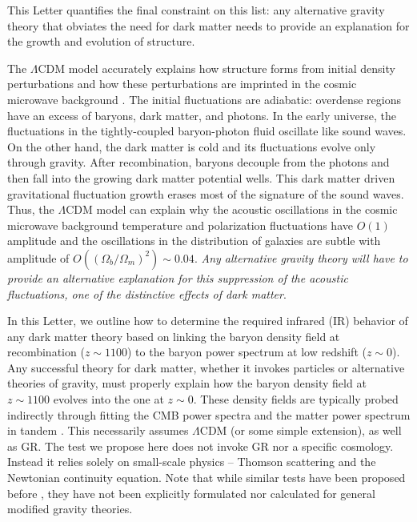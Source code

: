 \documentclass[floats,floatfix,showpacs,amssymb,amsmath,prl,twocolumn,superscriptaddress,nofootinbib, aps]{revtex4-2}
\begin{document}
This Letter quantifies the final constraint on this list: any alternative gravity theory that obviates the need for dark matter needs to provide an explanation for the growth and evolution of structure. 

The $\Lambda$CDM model accurately explains how structure forms from initial density perturbations and how these perturbations are imprinted in the cosmic microwave background \citep{Lifshitz1946, Peebles1970, Sunyaev1970b,Bond1984, Peebles1984}. The initial fluctuations are adiabatic: overdense regions have an excess of baryons, dark matter, and photons. In the early universe, the fluctuations in the tightly-coupled baryon-photon fluid oscillate like sound waves. On the other hand, the dark matter is cold and its fluctuations evolve only through gravity. After recombination, baryons decouple from the photons and then fall into the growing dark matter potential wells. This dark matter driven gravitational fluctuation growth erases most of the signature of the sound waves. Thus, the $\Lambda$CDM model can explain why the acoustic oscillations in the cosmic microwave background temperature and polarization fluctuations have $O(1)$ amplitude and the oscillations in the distribution of galaxies are subtle with amplitude of $O\left((\Omega_b/\Omega_m)^2\right) \sim 0.04$. {\it Any alternative gravity theory will have to provide an alternative explanation for this suppression of the acoustic fluctuations, one of the distinctive effects of dark matter}.

In this Letter, we outline how to determine the required infrared (IR) behavior of any dark matter theory based on linking the baryon density field at recombination ($z\sim1100$) to the baryon power spectrum at low redshift ($z\sim 0$). Any successful theory for dark matter, whether it invokes particles or alternative theories of gravity, must properly explain how the baryon density field at $z\sim 1100$ evolves into the one at $z\sim 0$. These density fields are typically probed indirectly through fitting the CMB power spectra and the matter power spectrum in tandem \citep[e.g.,][]{Spergel2003, Planck2018}. This necessarily assumes $\Lambda$CDM (or some simple extension), as well as GR. The test we propose here does not invoke GR nor a specific cosmology. Instead it relies solely on small-scale physics -- Thomson scattering and the Newtonian continuity equation. Note that while similar tests have been proposed before \citep{McGaugh2004, Dodelson2011}, they have not been explicitly formulated nor calculated for general modified gravity theories.
\end{document}

